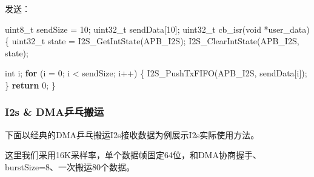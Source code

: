 \documentclass[
  12pt,
]{book}
\newenvironment{Shaded}{\begin{snugshade}}{\end{snugshade}}
\newcommand{\ControlFlowTok}[1]{\textcolor[rgb]{0.13,0.29,0.53}{\textbf{#1}}}
\newcommand{\DataTypeTok}[1]{\textcolor[rgb]{0.13,0.29,0.53}{#1}}
\newcommand{\DecValTok}[1]{\textcolor[rgb]{0.00,0.00,0.81}{#1}}
\newcommand{\NormalTok}[1]{#1}
\begin{document}
发送：

\begin{Shaded}
\begin{Highlighting}[]
\DataTypeTok{uint8_t}\NormalTok{  sendSize = }\DecValTok{10}\NormalTok{;}
\DataTypeTok{uint32_t}\NormalTok{ sendData[}\DecValTok{10}\NormalTok{];}
\DataTypeTok{uint32_t}\NormalTok{ cb_isr(}\DataTypeTok{void}\NormalTok{ *user_data)}
\NormalTok{\{ }
    \DataTypeTok{uint32_t}\NormalTok{ state = I2S_GetIntState(APB_I2S);}
\NormalTok{    I2S_ClearIntState(APB_I2S, state);}

    \DataTypeTok{int}\NormalTok{ i;}
    \ControlFlowTok{for}\NormalTok{ (i = }\DecValTok{0}\NormalTok{; i < sendSize; i++) \{}
\NormalTok{        I2S_PushTxFIFO(APB_I2S, sendData[i]);}
\NormalTok{    \}}
    \ControlFlowTok{return} \DecValTok{0}\NormalTok{;}
\NormalTok{\}}
\end{Highlighting}
\end{Shaded}

\hypertarget{i2s-dmaux4e52ux4e53ux642cux8fd0}{%
\subsubsection{I2s \& DMA乒乓搬运}\label{i2s-dmaux4e52ux4e53ux642cux8fd0}}

下面以经典的DMA乒乓搬运I2s接收数据为例展示I2s实际使用方法。

这里我们采用16K采样率，单个数据帧固定64位，和DMA协商握手、burstSize=8、一次搬运80个数据。
\end{document}
